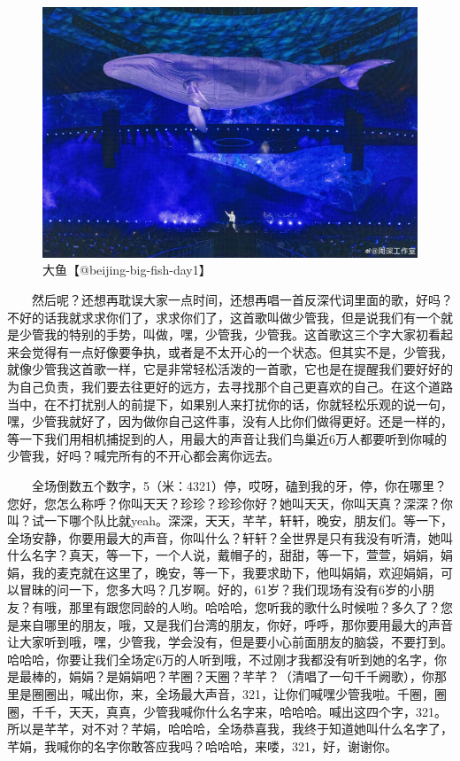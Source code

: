 \documentclass[]{ctexbook}
\begin{document}
\begin{figure}

{\centering \includegraphics[width=400pt]{img/beijing20240921/big-fish} 

}

\caption{大鱼【@beijing-big-fish-day1】}\label{fig:unnamed-chunk-100}
\end{figure}

  然后呢？还想再耽误大家一点时间，还想再唱一首反深代词里面的歌，好吗？不好的话我就求求你们了，求求你们了，这首歌叫做少管我，但是说我们有一个就是少管我的特别的手势，叫做，嘿，少管我，少管我。这首歌这三个字大家初看起来会觉得有一点好像要争执，或者是不太开心的一个状态。但其实不是，少管我，就像少管我这首歌一样，它是非常轻松活泼的一首歌，它也是在提醒我们要好好的为自己负责，我们要去往更好的远方，去寻找那个自己更喜欢的自己。在这个道路当中，在不打扰别人的前提下，如果别人来打扰你的话，你就轻松乐观的说一句，嘿，少管我就好了，因为做你自己这件事，没有人比你们做得更好。还是一样的，等一下我们用相机捕捉到的人，用最大的声音让我们鸟巢近6万人都要听到你喊的少管我，好吗？喊完所有的不开心都会离你远去。

  全场倒数五个数字，5（米：4321）停，哎呀，磕到我的牙，停，你在哪里？您好，您怎么称呼？你叫天天？珍珍？珍珍你好？她叫天天，你叫天真？深深？你叫？试一下哪个队比就yeah。深深，天天，芊芊，轩轩，晚安，朋友们。等一下，全场安静，你要用最大的声音，你叫什么？轩轩？全世界是只有我没有听清，她叫什么名字？真天，等一下，一个人说，戴帽子的，甜甜，等一下，萱萱，娟娟，娟娟，我的麦克就在这里了，晚安，等一下，我要求助下，他叫娟娟，欢迎娟娟，可以冒昧的问一下，您多大吗？几岁啊。好的，61岁？我们现场有没有6岁的小朋友？有哦，那里有跟您同龄的人哟。哈哈哈，您听我的歌什么时候啦？多久了？您是来自哪里的朋友，哦，又是我们台湾的朋友，你好，呼呼，那你要用最大的声音让大家听到哦，嘿，少管我，学会没有，但是要小心前面朋友的脑袋，不要打到。哈哈哈，你要让我们全场定6万的人听到哦，不过刚才我都没有听到她的名字，你是最棒的，娟娟？是娟娟吧？芊圈？天圈？芊芊？（清唱了一句千千阙歌），你那里是圈圈出，喊出你，来，全场最大声音，321，让你们喊嘿少管我啦。千圈，圈圈，千千，天天，真真，少管我喊你什么名字来，哈哈哈。喊出这四个字，321。所以是芊芊，对不对？芊娟，哈哈哈，全场恭喜我，我终于知道她叫什么名字了，芊娟，我喊你的名字你敢答应我吗？哈哈哈，来喽，321，好，谢谢你。
\end{document}
